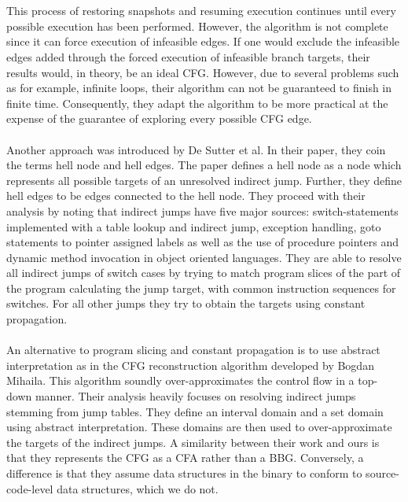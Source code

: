 \documentclass{kththesis}
\begin{document}
\\ \\
This process of restoring snapshots and resuming execution continues until every possible execution has been performed. However, the algorithm is not complete since it can force execution of infeasible edges. If one would exclude the infeasible edges added through the forced execution of infeasible branch targets, their results would, in theory, be an ideal CFG. However, due to several problems such as for example, infinite loops, their algorithm can not be guaranteed to finish in finite time. Consequently, they adapt the algorithm to be more practical at the expense of the guarantee of exploring every possible CFG edge. 
\\ \\
Another approach was introduced by De Sutter et al\cite{staticOfInd}. In their paper, they coin the terms hell node and hell edges. The paper defines a hell node as a node which represents all possible targets of an unresolved indirect jump. Further, they define hell edges to be edges connected to the hell node. They proceed with their analysis by noting that indirect jumps have five major sources: switch-statements implemented with a table lookup and indirect jump, exception handling, goto statements to pointer assigned labels as well as the use of procedure pointers and dynamic method invocation in object oriented languages. They are able to resolve all indirect jumps of switch cases by trying to match program slices of the part of the program calculating the jump target, with common instruction sequences for switches. For all other jumps they try to obtain the targets using constant propagation.
\\ \\
An alternative to program slicing and constant propagation is to use abstract interpretation as in the CFG reconstruction algorithm developed by Bogdan Mihaila\parencite{CFGFromPowerPC}. This algorithm soundly over-approximates the control flow in a top-down manner. Their analysis heavily focuses on resolving indirect jumps stemming from jump tables. They define an interval domain and a set domain using abstract interpretation. These domains are then used to over-approximate the targets of the indirect jumps. A similarity between their work and ours is that they represents the CFG as a CFA rather than a BBG. Conversely, a difference is that they assume data structures in the binary to conform to source-code-level data structures, which we do not. 
\\ \\ 
\end{document}
